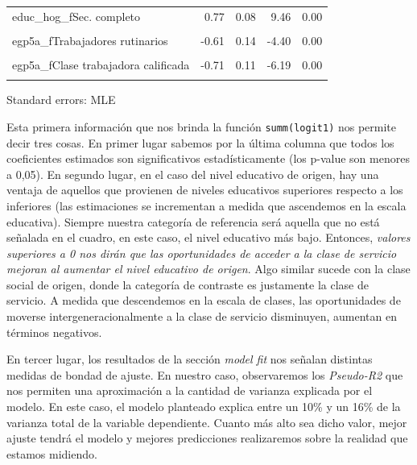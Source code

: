 \documentclass[
]{book}
\begin{document}
\begin{table}[!h]
\begin{threeparttable}
\begin{tabular}{lrrrr}
educ\_hog\_fSec. completo & 0.77 & 0.08 & 9.46 & 0.00\\
\cellcolor{gray!6}{educ\_hog\_fSuperior completo} & \cellcolor{gray!6}{1.22} & \cellcolor{gray!6}{0.11} & \cellcolor{gray!6}{11.20} & \cellcolor{gray!6}{0.00}\\
egp5a\_fTrabajadores rutinarios & -0.61 & 0.14 & -4.40 & 0.00\\
\cellcolor{gray!6}{egp5a\_fPequeña Burguesía} & \cellcolor{gray!6}{-0.66} & \cellcolor{gray!6}{0.10} & \cellcolor{gray!6}{-6.68} & \cellcolor{gray!6}{0.00}\\
\addlinespace
egp5a\_fClase trabajadora calificada & -0.71 & 0.11 & -6.19 & 0.00\\
\cellcolor{gray!6}{egp5a\_fClase trabajadora no calificada} & \cellcolor{gray!6}{-1.38} & \cellcolor{gray!6}{0.11} & \cellcolor{gray!6}{-12.88} & \cellcolor{gray!6}{0.00}\\
\bottomrule
\end{tabular}
\begin{tablenotes}
\item Standard errors: MLE
\end{tablenotes}
\end{threeparttable}
\end{table}

Esta primera información que nos brinda la función \texttt{summ(logit1)} nos permite decir tres cosas. En primer lugar sabemos por la última columna que todos los coeficientes estimados son significativos estadísticamente (los p-value son menores a 0,05). En segundo lugar, en el caso del nivel educativo de origen, hay una ventaja de aquellos que provienen de niveles educativos superiores respecto a los inferiores (las estimaciones se incrementan a medida que ascendemos en la escala educativa). Siempre nuestra categoría de referencia será aquella que no está señalada en el cuadro, en este caso, el nivel educativo más bajo. Entonces, \emph{valores superiores a 0 nos dirán que las oportunidades de acceder a la clase de servicio mejoran al aumentar el nivel educativo de origen}. Algo similar sucede con la clase social de origen, donde la categoría de contraste es justamente la clase de servicio. A medida que descendemos en la escala de clases, las oportunidades de moverse intergeneracionalmente a la clase de servicio disminuyen, aumentan en términos negativos.

En tercer lugar, los resultados de la sección \emph{model fit} nos señalan distintas medidas de bondad de ajuste. En nuestro caso, observaremos los \emph{Pseudo-R2} que nos permiten una aproximación a la cantidad de varianza explicada por el modelo. En este caso, el modelo planteado explica entre un 10\% y un 16\% de la varianza total de la variable dependiente. Cuanto más alto sea dicho valor, mejor ajuste tendrá el modelo y mejores predicciones realizaremos sobre la realidad que estamos midiendo.
\end{document}
